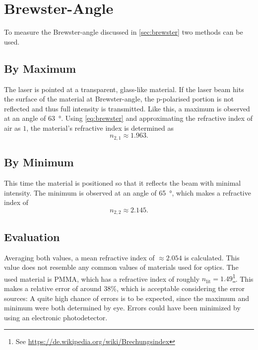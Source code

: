 \chapter{Brewster-Angle}
To measure the Brewster-angle discussed in \autoref{sec:brewster} two methods can be used.

\section{By Maximum}
The laser is pointed at a transparent, glass-like material.
If the laser beam hits the surface of the material at Brewster-angle, the p-polarised portion is not reflected and thus full intensity is transmitted.
Like this, a maximum is observed at an angle of \SI{63}{\degree}.
Using \autoref{eq:brewster} and approximating the refractive index of air as $1$, the material's refractive index is determined as
\begin{equation*}
	n_{2,1}\approx\num{1.963}.
\end{equation*}

\section{By Minimum}
This time the material is positioned so that it reflects the beam with minimal intensity.
The minimum is observed at an angle of \SI{65}{\degree}, which makes a refractive index of
\begin{equation*}
	n_{2,2}\approx\num{2.145}.
\end{equation*}

\section{Evaluation}
Averaging both values, a mean refractive index of $\approx\num{2.054}$ is calculated.
This value does not resemble any common values of materials used for optics.
The used material is PMMA, which has a refractive index of roughly $n_\text{lit}=\num{1.49}$\footnote{See \url{https://de.wikipedia.org/wiki/Brechungsindex}}.
This makes a relative error of around \num{38}\%, which is acceptable considering the error sources:
A quite high chance of errors is to be expected, since the maximum and minimum were both determined by eye.
Errors could have been minimized by using an electronic photodetector.
